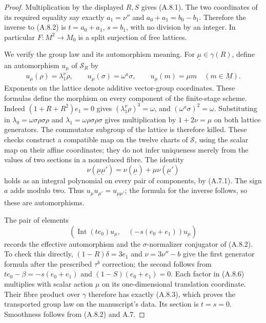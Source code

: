 \begin{proof}
Multiplication by the displayed $R,S$ gives (A.8.1). The two
coordinates of its required equality say exactly
$a_1=\nu''$ and $a_0+a_1=b_0-b_1$. Therefore the inverse to (A.8.2)
is $t=a_0+a_1$, $s=b_1$, with no division by an integer. In
particular $F:M^2\to M_0$ is a split surjection of free lattices.

We verify the group law and its automorphism meaning. For
$\underline\mu\in\gamma(R)$, define an automorphism $u_{\underline\mu}$
of $\mathcal S_R$ by
\[
 u_{\underline\mu}(\rho)=\lambda_1^{\nu}\rho,\qquad
 u_{\underline\mu}(\sigma)=\omega^a\sigma,
 \qquad u_{\underline\mu}(m)=\mu m\quad(m\in\underline M). \tag{A.8.5}
\]
Exponents on the lattice denote additive vector-group coordinates.
These formulas define the morphism on every component of the
finite-stage scheme. Indeed $(1+R+R^2)e_1=0$ gives
$(\lambda_1^\nu\rho)^3=\omega$, and
$(\omega^a\sigma)^2=\omega$. Substituting in
$\lambda_0=\omega\sigma\rho\sigma\rho$ and
$\lambda_1=\omega\rho\sigma\rho\sigma$ gives multiplication by
$1+2\nu=\mu$ on both lattice generators. The commutator subgroup of
the lattice is therefore killed. These checks construct a compatible
map on the twelve charts of $\mathcal S$, using the scalar map on
their affine coordinates; they do not infer uniqueness merely from
the values of two sections in a nonreduced fibre. The identity
\[
 \nu(\underline\mu\underline\mu')
 =\nu(\underline\mu)+\mu\nu(\underline\mu')
\]
holds as an integral polynomial on every pair of components, by
(A.7.1). The sign $a$ adds modulo two. Thus
$u_{\underline\mu}u_{\underline\mu'}=u_{\underline\mu\underline\mu'}$;
the formula for the inverse follows, so these are automorphisms.

The pair of elements
\[
 \left(\operatorname{Int}(t e_0)u_{\underline\mu},\quad
       (-s(e_0+e_1))u_{\underline\mu}\right)        \tag{A.8.6}
\]
records the effective automorphism and the $\sigma$-normalizer
conjugator of (A.8.2). To check this directly,
$(1-R)\delta=3e_1$ and $\nu=3\nu''-b$ give the first generator
formula after the prescribed $\tau^b$ correction; the second follows
from $t e_0-\beta=-s(e_0+e_1)$ and
$(1-S)(e_0+e_1)=0$. Each factor in (A.8.6) multiplies with scalar
action $\mu$ on its one-dimensional translation coordinate. Their
fibre product over $\gamma$ therefore has exactly (A.8.3), which
proves the transported group law on the manuscript's data. Its
section is $t=s=0$. Smoothness follows from (A.8.2) and A.7.
\end{proof}

